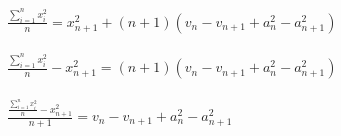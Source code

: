 \noindent
$ {\displaystyle \frac{\sum_{i=1}^{n}x_i^2}{n} = x_{n+1}^2 + (n+1)(v_n-v_{n+1} + a_n^2-a_{n+1}^2) } $\\\\

\noindent
$ {\displaystyle \frac{\sum_{i=1}^{n}x_i^2}{n} - x_{n+1}^2 = (n+1)(v_n-v_{n+1} + a_n^2-a_{n+1}^2) } $\\\\

\noindent
$ {\displaystyle \frac{\frac{\sum_{i=1}^{n}x_i^2}{n} - x_{n+1}^2}{n+1} = v_n-v_{n+1} + a_n^2-a_{n+1}^2 } $\\\\

\noindent
{}
